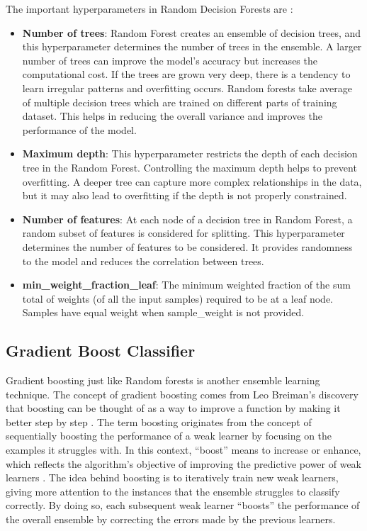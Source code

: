 The important hyperparameters in Random Decision Forests are \citep{scikit-learn}:
\begin{itemize}
  \item \textbf{Number of trees}: Random Forest creates an ensemble of decision trees, and this hyperparameter determines the number of trees in the ensemble. A larger number of trees can improve the model's accuracy but increases the computational cost. If the trees are grown very deep, there is a tendency to learn irregular patterns and overfitting occurs. Random forests take average of multiple decision trees which are trained on different parts of training dataset. This helps in reducing the overall variance and improves the performance of the model. 
  
  \item \textbf{Maximum depth}: This hyperparameter restricts the depth of each decision tree in the Random Forest. Controlling the maximum depth helps to prevent overfitting. A deeper tree can capture more complex relationships in the data, but it may also lead to overfitting if the depth is not properly constrained.
  
  \item \textbf{Number of features}: At each node of a decision tree in Random Forest, a random subset of features is considered for splitting. This hyperparameter determines the number of features to be considered. It provides randomness to the model and reduces the correlation between trees.

  \item \textbf{min\_weight\_fraction\_leaf}: The minimum weighted fraction of the sum total of weights (of all the input samples) required to be at a leaf node. Samples have equal weight when sample\_weight is not provided.
\end{itemize}


\subsection{Gradient Boost Classifier} \label{sec:classifiergbc}

Gradient boosting just like Random forests is another ensemble learning technique. The concept of gradient boosting comes from Leo Breiman's discovery that boosting can be thought of as a way to improve a function by making it better step by step \citep{Breiman2001}. The term boosting originates from the concept of sequentially boosting the performance of a weak learner by focusing on the examples it struggles with. In this context, ``boost'' means to increase or enhance, which reflects the algorithm's objective of improving the predictive power of weak learners \citep{Rokach2010}. The idea behind boosting is to iteratively train new weak learners, giving more attention to the instances that the ensemble struggles to classify correctly. By doing so, each subsequent weak learner ``boosts'' the performance of the overall ensemble by correcting the errors made by the previous learners. \citep{hastie-ch10}

